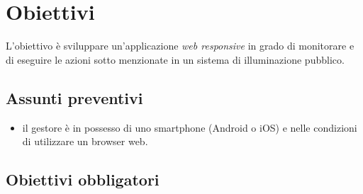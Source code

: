 \section{Obiettivi}

L’obiettivo è sviluppare un’applicazione \textit{web responsive} in grado di monitorare e di eseguire le azioni sotto menzionate in un sistema di illuminazione pubblico.

\subsection{Assunti preventivi}

\begin{itemize}
    \item il gestore è in possesso di uno smartphone (Android o iOS) e nelle condizioni di utilizzare un browser web.
\end{itemize}

\subsection{Obiettivi obbligatori}

